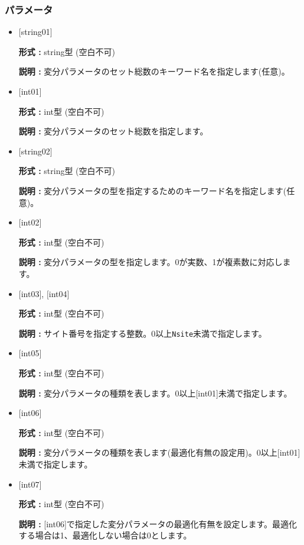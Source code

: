 \subsubsection{パラメータ}
 \begin{itemize}

   \item  $[$string01$]$
   
    {\bf 形式 :} string型 (空白不可)

   {\bf 説明 :} 変分パラメータのセット総数のキーワード名を指定します(任意)。

   \item  $[$int01$]$
   
    {\bf 形式 :} int型 (空白不可)

   {\bf 説明 :} 変分パラメータのセット総数を指定します。

   \item  $[$string02$]$
   
    {\bf 形式 :} string型 (空白不可)

   {\bf 説明 :} 変分パラメータの型を指定するためのキーワード名を指定します(任意)。

   \item  $[$int02$]$
   
    {\bf 形式 :} int型 (空白不可)

   {\bf 説明 :} 変分パラメータの型を指定します。0が実数、1が複素数に対応します。

  \item  $[$int03$]$, $[$int04$]$
   
 {\bf 形式 :} int型 (空白不可)

{\bf 説明 :} サイト番号を指定する整数。0以上\verb|Nsite|{未満}で指定します。
 
 \item  $[$int05$]$
   
   {\bf 形式 :} int型 (空白不可)

  {\bf 説明 :} 変分パラメータの種類を表します。0以上[int01]{未満}で指定します。

 \item  $[$int06$]$
   
   {\bf 形式 :} int型 (空白不可)

  {\bf 説明 :} 変分パラメータの種類を表します(最適化有無の設定用)。0以上[int01]{未満}で指定します。
  
 \item  $[$int07$]$
   
   {\bf 形式 :} int型 (空白不可)

  {\bf 説明 :} [int06]で指定した変分パラメータの最適化有無を設定します。最適化する場合は1、最適化しない場合は0とします。
  
  
\end{itemize}

